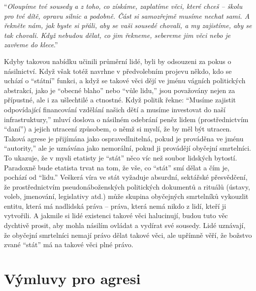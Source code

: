 \documentclass{book}
\begin{document}
\enquote{\emph{Oloupíme tvé sousedy a z toho, co získáme, zaplatíme věci, které chceš -- školu pro tvé dítě, opravu silnic a podobně. Část si samozřejmě musíme nechat sami. A řekněte nám, jak byste si přáli, aby se vaši sousedé chovali, a my zajistíme, aby se tak chovali. Když nebudou dělat, co jim řekneme, sebereme jim věci nebo je zavřeme do klece}.}

Kdyby takovou nabídku učinili průměrní lidé, byli by odsouzeni za pokus o násilnictví. Když však totéž navrhne v předvolebním projevu někdo, kdo se uchází o \enquote{státní} funkci, a když se takové věci dějí ve jménu vágních politických abstrakcí, jako je \enquote{obecné blaho} nebo \enquote{vůle lidu,} jsou považovány nejen za přípustné, ale i za ušlechtilé a ctnostné. Když politik řekne: \enquote{Musíme zajistit odpovídající financování vzdělání našich dětí a musíme investovat do naší infrastruktury,} mluví doslova o násilném odebrání peněz lidem (prostřednictvím \enquote{daní}) a jejich utracení způsobem, o němž si myslí, že by měl být utracen. Taková agrese je přijímána jako ospravedlnitelná, pokud je prováděna ve jménu \enquote{autority,} ale je uznávána jako nemorální, pokud ji provádějí obyčejní smrtelníci. To ukazuje, že v mysli etatisty je \enquote{stát} něco víc než soubor lidských bytostí. Paradoxně bude etatista trvat na tom, že vše, co \enquote{stát} smí dělat a čím je, pochází od \enquote{lidu.} Veškerá víra ve stát vyžaduje absurdní, sektářské přesvědčení, že prostřednictvím pseudonáboženských politických dokumentů a rituálů (ústavy, voleb, jmenování, legislativy atd.) může skupina obyčejných smrtelníků vykouzlit entitu, která má nadlidská práva -- práva, která nemá nikdo z lidí, kteří ji vytvořili. A jakmile si lidé existenci takové věci halucinují, budou tuto věc dychtivě prosit, aby mohla násilím ovládat a vydírat své sousedy. Lidé uznávají, že obyčejní smrtelníci nemají právo dělat takové věci, ale upřímně věří, že božstvo zvané \enquote{stát} má na takové věci plné právo.

\section{Výmluvy pro agresi}
\end{document}
